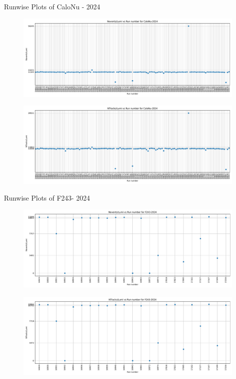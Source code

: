 \begin{frame}{Runwise Plots of CaloNu - 2024}
    \begin{figure}
        \centering
        \includegraphics[width=1.0\textwidth]{plots_runwise/NEventsbyLumi_2024_CaloNu.pdf}
    \end{figure}
    \vspace{-0.35cm}
    \begin{figure}
        \centering
        \includegraphics[width=1.0\textwidth]{plots_runwise/NTracksbyLumi_2024_CaloNu.pdf}
    \end{figure}
\end{frame}

\begin{frame}{Runwise Plots of F243- 2024}
    \begin{figure}
        \centering
        \includegraphics[width=1.0\textwidth]{plots_runwise/NEventsbyLumi_2024_F243.pdf}
    \end{figure}
    \vspace{-0.35cm}
    \begin{figure}
        \centering
        \includegraphics[width=1.0\textwidth]{plots_runwise/NTracksbyLumi_2024_F243.pdf}
    \end{figure}
\end{frame}
